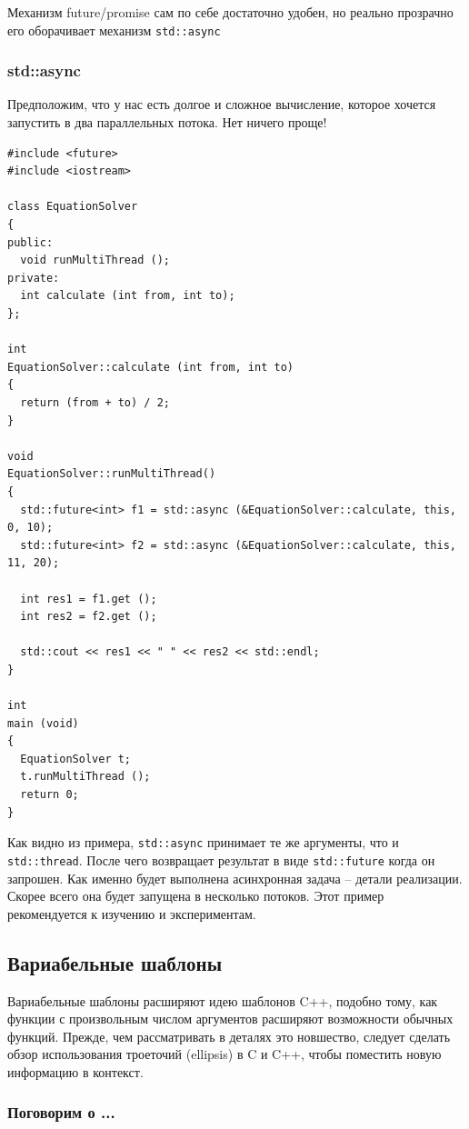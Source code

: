 \documentclass[a4paper,12pt,oneside]{article}
\renewcommand{\texttt}[2][black]{\textcolor{#1}{\ttfamily #2}}
\begin{document}
Механизм future/promise сам по себе достаточно удобен, но реально прозрачно его оборачивает механизм \lstinline!std::async!

\subsubsection{std::async}

Предположим, что у нас есть долгое и сложное вычисление, которое хочется запустить в два параллельных потока. Нет ничего проще!

\begin{lstlisting}
#include <future>
#include <iostream>

class EquationSolver
{
public:
  void runMultiThread ();
private:
  int calculate (int from, int to);  
};

int 
EquationSolver::calculate (int from, int to)
{
  return (from + to) / 2;
}

void 
EquationSolver::runMultiThread()
{
  std::future<int> f1 = std::async (&EquationSolver::calculate, this,  0, 10);
  std::future<int> f2 = std::async (&EquationSolver::calculate, this, 11, 20);

  int res1 = f1.get ();
  int res2 = f2.get ();

  std::cout << res1 << " " << res2 << std::endl;
}

int
main (void)
{
  EquationSolver t;
  t.runMultiThread ();
  return 0;
}
\end{lstlisting}

Как видно из примера, \lstinline!std::async! принимает те же аргументы, что и \lstinline!std::thread!. После чего возвращает результат в виде \lstinline!std::future! когда он запрошен. Как именно будет выполнена асинхронная задача -- детали реализации. Скорее всего она будет запущена в несколько потоков.
Этот пример рекомендуется к изучению и экспериментам.

\subsection{Вариабельные шаблоны}

Вариабельные шаблоны расширяют идею шаблонов C++, подобно тому, как функции с произвольным числом аргументов расширяют возможности обычных функций. Прежде, чем рассматривать в деталях это новшество, следует сделать обзор использования троеточий (ellipsis) в C и C++, чтобы поместить новую информацию в контекст.

\subsubsection{Поговорим о \texttt{...}}
\end{document}
